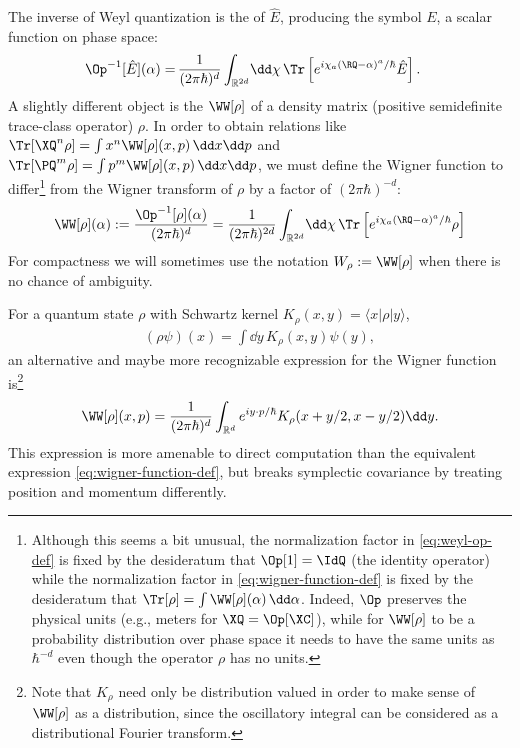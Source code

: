 \documentclass{article}
\numberwithin{equation}{section}
\begin{document}
The inverse of Weyl quantization is the  of 
$\hat{E}$, producing the symbol $E$, a scalar function on phase space: 
\begin{align}
    \label{eq:wigner-weyl-def}
    \Op^{-1}[\hat{E}](\alpha)
    =&\,  
    \frac{1}{(2\pi\hbar)^d}
    \int_{\mathbb{R}^{2d}}\! \dd \chi\, \Tr\left[e^{i \chi_a (\RQ-\alpha)^a/\hbar} \hat{E}\right].
\end{align}
A slightly different object is the  $\WW[\rho]$ of a density matrix (positive semidefinite trace-class operator) $\rho$.  In order to obtain relations like $\Tr[\XQ^n\rho] = \int x^n  \WW[\rho](x,p) \, \dd x \dd p$ and $\Tr[\PQ^m\rho] = \int p^m \WW[\rho](x,p)  \, \dd x \dd p$, we must define the Wigner function to differ\footnote{Although this seems a bit unusual, the normalization factor 
in \eqref{eq:weyl-op-def}
is fixed by the desideratum that 
$\Op[1] = \IdQ$ (the identity operator)
while the normalization factor in \eqref{eq:wigner-function-def} is fixed by the desideratum that $\Tr[\rho]=\int \WW[\rho](\alpha)\,\dd\alpha$. Indeed, $\Op$ preserves the physical units (e.g., meters for $\XQ = \Op[\XC]$), while for $\WW[\rho]$ to be a probability distribution over phase space it needs to have the same units as $\hbar^{-d}$ even though the operator $\rho$ has no units.} from the Wigner transform of $\rho$ by a factor of $(2\pi\hbar)^{-d}$:
\begin{align}
    \label{eq:wigner-function-def}
    \WW[\rho](\alpha) := \frac{\Op^{-1}[\rho](\alpha)}{(2\pi\hbar)^d} 
    = 
    \frac{1}{(2\pi\hbar)^{2d}}
    \int_{\mathbb{R}^{2d}}\! \dd \chi\, \Tr\left[e^{i \chi_a (\RQ-\alpha)^a/\hbar} \rho\right]
\end{align}
For compactness we will sometimes use the notation $W_\rho := \WW[\rho]$ when there is no chance of ambiguity. 

For a quantum state $\rho$ with Schwartz kernel $K_{\rho}(x,y) = \langle x |\rho|y\rangle$, 
\begin{align}
    (\rho\psi)(x) = \int\!\dd y\, K_{\rho}(x,y)\psi(y),
\end{align}
an alternative and maybe more recognizable expression for the Wigner function is\footnote{Note that $K_{\rho}$ need only be distribution valued in order
to make sense of $\WW[\rho]$ as a distribution, since the oscillatory integral can be considered as a distributional Fourier 
transform.}
\begin{align}
    \label{eq:wigner-weyl-kernel-def}
    \WW[\rho](x,p)
    = 
    \frac{1}{(2\pi \hbar)^{d}}\int_{\mathbb{R}^{d}} e^{i y\cdot p/\hbar} K_{\rho}(x+y/2,x-y/2) \dd y.
\end{align}
This expression is more amenable to direct computation than the equivalent expression \eqref{eq:wigner-function-def}, but breaks symplectic covariance by treating position and momentum differently.
\end{document}
